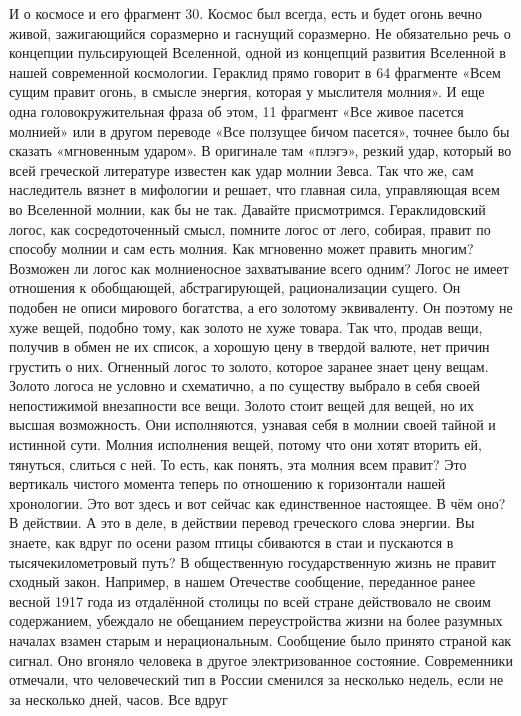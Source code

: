 И о космосе и его фрагмент 30. Космос был всегда, есть и будет огонь вечно
живой, зажигающийся соразмерно и гаснущий соразмерно. Не обязательно речь о
концепции пульсирующей Вселенной, одной из концепций развития Вселенной в нашей
современной космологии. Гераклид прямо говорит в 64 фрагменте «Всем сущим правит
огонь, в смысле энергия, которая у мыслителя молния». И еще одна
головокружительная фраза об этом, 11 фрагмент «Все живое пасется молнией» или в
другом переводе «Все ползущее бичом пасется», точнее было бы сказать «мгновенным
ударом». В оригинале там «плэгэ», резкий удар, который во всей греческой
литературе известен как удар молнии Зевса. Так что же, сам наследитель вязнет в
мифологии и решает, что главная сила, управляющая всем во Вселенной молнии, как
бы не так. Давайте присмотримся. Гераклидовский логос, как сосредоточенный
смысл, помните логос от лего, собирая, правит по способу молнии и сам есть
молния. Как мгновенно может править многим? Возможен ли логос как молниеносное
захватывание всего одним? Логос не имеет отношения к обобщающей, абстрагирующей,
рационализации сущего. Он подобен не описи мирового богатства, а его золотому
эквиваленту. Он поэтому не хуже вещей, подобно тому, как золото не хуже товара.
Так что, продав вещи, получив в обмен не их список, а хорошую цену в твердой
валюте, нет причин грустить о них. Огненный логос то золото, которое заранее
знает цену вещам. Золото логоса не условно и схематично, а по существу выбрало в
себя своей непостижимой внезапности все вещи. Золото стоит вещей для вещей, но
их высшая возможность. Они исполняются, узнавая себя в молнии своей тайной и
истинной сути. Молния исполнения вещей, потому что они хотят вторить ей,
тянуться, слиться с ней. То есть, как понять, эта молния всем правит? Это
вертикаль чистого момента теперь по отношению к горизонтали нашей хронологии.
Это вот здесь и вот сейчас как единственное настоящее. В чём оно? В действии. А
это в деле, в действии перевод греческого слова энергии. Вы знаете, как вдруг по
осени разом птицы сбиваются в стаи и пускаются в тысячекилометровый путь? В
общественную государственную жизнь не правит сходный закон. Например, в нашем
Отечестве сообщение, переданное ранее весной 1917 года из отдалённой столицы по
всей стране действовало не своим содержанием, убеждало не обещанием
переустройства жизни на более разумных началах взамен старым и нерациональным.
Сообщение было принято страной как сигнал. Оно вгоняло человека в другое
электризованное состояние. Современники отмечали, что человеческий тип в России
сменился за несколько недель, если не за несколько дней, часов. Все вдруг
